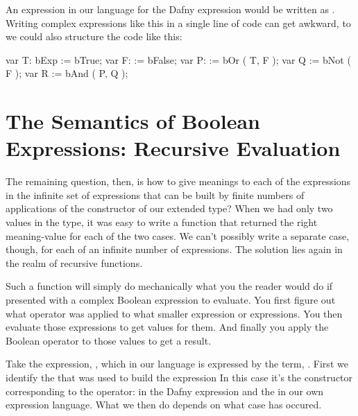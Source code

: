 \documentclass[letterpaper,10pt,english]{sphinxmanual}
\begin{document}
An expression in our  language for the Dafny expression  would be written as . Writing complex expressions like this in
a single line of code can get awkward, to we could also structure the
code like this:

\begin{sphinxVerbatim}[commandchars=\\\{\}]
var T: bExp := bTrue;
var F:      := bFalse;
var P:      := bOr ( T,  F );
var Q       := bNot ( F );
var R       := bAnd ( P, Q );
\end{sphinxVerbatim}


\section{The Semantics of Boolean Expressions: Recursive Evaluation}
\label{\detokenize{07-boolean-algebra:the-semantics-of-boolean-expressions-recursive-evaluation}}
The remaining question, then, is how to give meanings to each of the
expressions in the infinite set of expressions that can be built by
finite numbers of applications of the constructor of our extended
 type? When we had only two values in the type, it was easy to
write a function that returned the right meaning-value for each of the
two cases. We can’t possibly write a separate case, though, for each
of an infinite number of expressions. The solution lies again in the
realm of recursive functions.

Such a function will simply do mechanically what you the reader would
do if presented with a complex Boolean expression to evaluate.  You
first figure out what operator was applied to what smaller expression
or expressions. You then evaluate those expressions to get values for
them. And finally you apply the Boolean operator to those values to
get a result.

Take the expression, , which in our
language is expressed by the term, . First we identify the  that was used to build
the expression In this case it’s the constructor corresponding to the
 operator: \sphinxstyleemphasis{\&\&} in the Dafny expression and the  in our own
expression language. What we then do depends on what case has occured.
\end{document}

